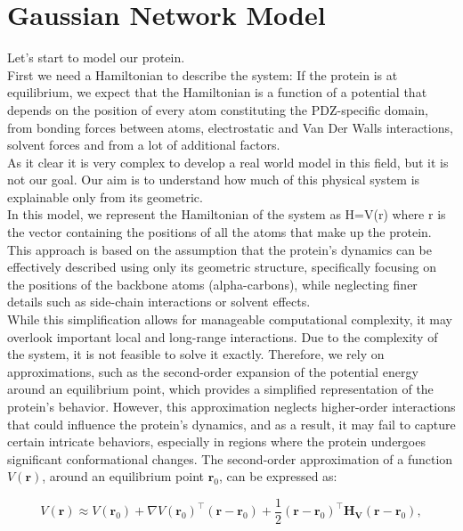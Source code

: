 \documentclass[English, Lau, oneside]{sapthesis}
\begin{document}
\section{Gaussian Network Model}
\noindent
Let's start to model our protein.\\ First we need a Hamiltonian to describe the system:
If the protein is at equilibrium, we expect that the Hamiltonian is a function of a potential that depends on the position of every atom constituting the PDZ-specific domain, from bonding forces between atoms, electrostatic and Van Der Walls interactions, solvent forces and from a lot of additional factors.\\
As it clear it is very complex to develop a real world model in this field, but it is not our goal. Our aim is to understand how much of this physical system is explainable only from its geometric.\\
In this model, we represent the Hamiltonian of the system as H=V(r) where r is the vector containing the positions of all the atoms that make up the protein. This approach is based on the assumption that the protein’s dynamics can be effectively described using only its geometric structure, specifically focusing on the positions of the backbone atoms (alpha-carbons), while neglecting finer details such as side-chain interactions or solvent effects.\\
While this simplification allows for manageable computational complexity, it may overlook important local and long-range interactions.
Due to the complexity of the system, it is not feasible to solve it exactly. Therefore, we rely on approximations, such as the second-order expansion of the potential energy around an equilibrium point, which provides a simplified representation of the protein's behavior. However, this approximation neglects higher-order interactions that could influence the protein’s dynamics, and as a result, it may fail to capture certain intricate behaviors, especially in regions where the protein undergoes significant conformational changes.
The second-order approximation of a function \( V(\mathbf{r}) \), around an equilibrium point \( \mathbf{r}_0 \), can be expressed as:\cite{ref9}

\begin{equation}
V(\mathbf{r}) \approx V(\mathbf{r}_0) + \nabla V(\mathbf{r}_0)^\top (\mathbf{r} - \mathbf{r}_0) + \frac{1}{2} (\mathbf{r} - \mathbf{r}_0)^\top \mathbf{H_V} (\mathbf{r} - \mathbf{r}_0),\label{hessian}
\end{equation}
\end{document}
